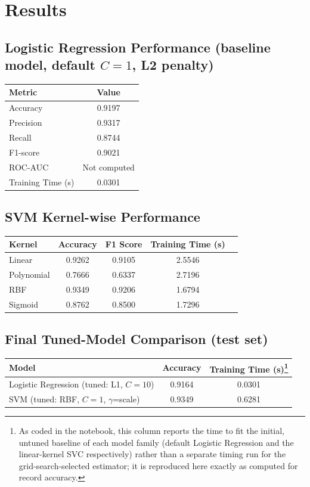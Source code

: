 \documentclass[12pt,a4paper]{article}
\begin{document}
\section{Results}
 
\subsection*{Logistic Regression Performance (baseline model, default $C=1$, L2 penalty)}
\begin{tabular}{lc}
\toprule
Metric & Value\\
\midrule
Accuracy & 0.9197 \\
Precision & 0.9317 \\
Recall & 0.8744 \\
F1-score & 0.9021 \\
ROC-AUC & Not computed \\
Training Time (s) & 0.0301 \\
\bottomrule
\end{tabular}
 
\subsection*{SVM Kernel-wise Performance}
\begin{tabular}{lcccc}
\toprule
Kernel & Accuracy & F1 Score & Training Time (s)\\
\midrule
Linear & 0.9262 & 0.9105 & 2.5546 \\
Polynomial & 0.7666 & 0.6337 & 2.7196 \\
RBF & 0.9349 & 0.9206 & 1.6794 \\
Sigmoid & 0.8762 & 0.8500 & 1.7296 \\
\bottomrule
\end{tabular}
 
\subsection*{Final Tuned-Model Comparison (test set)}
\begin{tabular}{lcc}
\toprule
Model & Accuracy & Training Time (s)\footnote{As coded in the notebook, this column
reports the time to fit the initial, untuned baseline of each model family (default
Logistic Regression and the linear-kernel SVC respectively) rather than a separate
timing run for the grid-search-selected estimator; it is reproduced here exactly as
computed for record accuracy.}\\
\midrule
Logistic Regression (tuned: L1, $C=10$) & 0.9164 & 0.0301 \\
SVM (tuned: RBF, $C=1$, $\gamma$=scale) & 0.9349 & 0.6281 \\
\bottomrule
\end{tabular}
 
\end{document}
